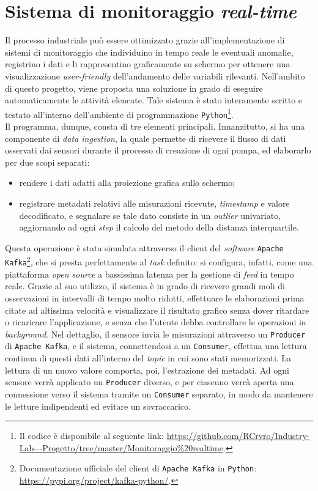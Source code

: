 \documentclass[fleqn,10pt]{SelfArx} %
\begin{document}
\section{Sistema di monitoraggio \textit{real-time}}
Il processo industriale può essere ottimizzato grazie all'implementazione di sistemi di monitoraggio che individuino in tempo reale le eventuali anomalie, registrino i dati e li rappresentino graficamente su schermo per ottenere una visualizzazione \textit{user-friendly} dell'andamento delle variabili rilevanti. Nell'ambito di questo progetto, viene proposta una soluzione in grado di eseguire automaticamente le attività elencate. Tale sistema è stato interamente scritto e testato all'interno dell'ambiente di programmazione \texttt{Python}\footnote{Il codice è disponibile al seguente link: \url{https://github.com/RCrvro/Industry-Lab---Progetto/tree/master/Monitoraggio\%20realtime}.}.\\
Il programma, dunque, consta di tre elementi principali. Innanzitutto, si ha una componente di \textit{data ingestion}, la quale permette di ricevere il flusso di dati osservati dai sensori durante il processo di creazione di ogni pompa, ed elaborarlo per due scopi separati:
    \begin{itemize}
        \item rendere i dati adatti alla proiezione grafica sullo schermo;
        \item registrare metadati relativi alle misurazioni ricevute, \textit{timestamp} e valore decodificato, e segnalare se tale dato consiste in un \textit{outlier} univariato, aggiornando ad ogni \textit{step} il calcolo del metodo della distanza interquartile. 
    \end{itemize}
Questa operazione è stata simulata attraverso il client del \textit{software} \texttt{Apache Kafka}\footnote{Documentazione ufficiale del client di \texttt{Apache Kafka} in \texttt{Python}: \url{https://pypi.org/project/kafka-python/}.}, che si presta perfettamente al \textit{task} definito: si configura, infatti, come una piattaforma \textit{open source} a bassissima latenza per la gestione di \textit{feed} in tempo reale. Grazie al suo utilizzo, il sistema è in grado di ricevere grandi moli di osservazioni in intervalli di tempo molto ridotti, effettuare le elaborazioni prima citate ad altissima velocità e visualizzare il risultato grafico senza dover ritardare o ricaricare l'applicazione, e senza che l'utente debba controllare le operazioni in \textit{background}. Nel dettaglio, il sensore invia le misurazioni attraverso un \texttt{Producer} di \texttt{Apache Kafka}, e il sistema, connettendosi a un \texttt{Consumer}, effettua una lettura continua di questi dati all'interno del \textit{topic} in cui sono stati memorizzati. La lettura di un nuovo valore comporta, poi, l'estrazione dei metadati. Ad ogni sensore verrà applicato un \texttt{Producer} diverso, e per ciascuno verrà aperta una connessione verso il sistema tramite un \texttt{Consumer} separato, in modo da mantenere le letture indipendenti ed evitare un sovraccarico.\\
\end{document}

